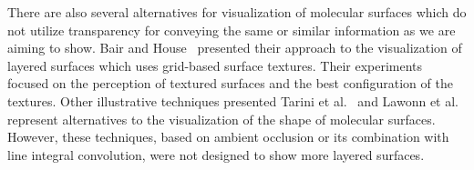 There are also several alternatives for visualization of molecular surfaces which do not utilize transparency for conveying the same or similar information as we are aiming to show.
Bair and House~\cite{Bair2007} presented their approach to the visualization of layered surfaces which uses grid-based surface textures.
Their experiments focused on the perception of textured surfaces and the best configuration of the textures. 
Other illustrative techniques presented Tarini et al.~\cite{Tarini2006} and Lawonn et al.~\cite{Lawonn2014} represent alternatives to the visualization of the shape of molecular surfaces. 
However, these techniques, based on ambient occlusion or its combination with line integral convolution, were not designed to show more layered surfaces.








